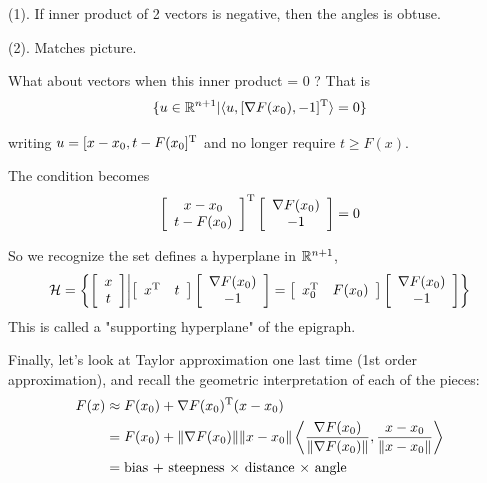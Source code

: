(1). If inner product of 2 vectors is negative, then the angles is obtuse.

(2). Matches picture.

What about vectors when this inner product = 0 ? That is
$$\{u\in\mathbb{R}^{n+1}|\langle u, [\nabla F(x_{0}) , -1]^{{\rm T}}\rangle=0\}$$

writing $u=[x-x_{0}, t-F(x_{0}]^{{\rm T}}$ and no longer require $t\geq F(x)$.

The condition becomes
$$
\left[
\begin{array}{c} 
	x-x_{0}\\
	t-F(x_{0})
\end{array}
\right]^{{\rm T}}  
\left[
\begin{array}{c} 
\nabla F(x_{0})\\
-1
\end{array}
\right]
=
0
$$

So we recognize the set defines a hyperplane in $\mathbb{R}^{n+1}$,
$$\mathcal{H}=\left\{\left[
\begin{array}{c} 
	x \\
    t
\end{array}
\right]  
\middle|      
\left[
\begin{array}{cc} 
x^{{\rm T}}&t
\end{array}
\right]  
\left[
\begin{array}{c} 
\nabla F(x_{0}) \\
-1
\end{array}
\right]  
=
\left[
\begin{array}{cc} 
x_{0}^{{\rm T}}&F(x_{0})
\end{array}
\right]  
\left[
\begin{array}{c} 
	\nabla F(x_{0}) \\
	-1
\end{array}
\right]  
\right\}$$
This is called a "supporting hyperplane" of the epigraph.

Finally, let's look at Taylor approximation one last time (1st order approximation), and recall the geometric interpretation of each of the pieces:
\begin{align*}
F(x)&\approx F(x_{0})+ \nabla F(x_{0})^{{\rm T}}(x-x_{0})\\
&=F(x_{0})+\Vert\nabla F(x_{0})\Vert \Vert x-x_{0}\Vert \left< \frac{\nabla F(x_{0})}{\Vert\nabla F(x_{0})\Vert},\frac{x-x_{0}}{\Vert x-x_{0}\Vert}\right>\\
&=\text{bias + steepness $\times$ distance $\times$ angle }
\end{align*}
























 








